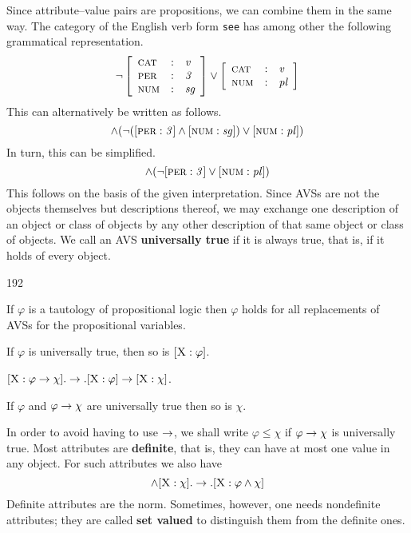 Since attribute--value pairs are propositions, we can combine
them in the same way. The category of the English verb form 
{\tt see} has among other the following grammatical representation.
\begin{equation}
\nicht \left[\begin{array}{l@{\quad : \quad}l}
\mbox{\sc cat} & \mbox{\it v} \\
\mbox{\sc per} & \mbox{\it 3} \\
\mbox{\sc num} & \mbox{\it sg}
\end{array}\right]
\oder
\left[\begin{array}{l@{\quad : \quad}l}
\mbox{\sc cat} & \mbox{\it v} \\
\mbox{\sc num} & \mbox{\it pl}
\end{array}\right]
\end{equation}
This can alternatively be written as follows.
\begin{equation}
[\mbox{\sc cat} : \mbox{\it v\/} ] \und
(\nicht ([\mbox{\sc per} : \mbox{\it 3\/}] \und
    [\mbox{\sc num} : \mbox{\it sg\/}]) \oder
[\mbox{\sc num} : \mbox{\it pl\/}])
\end{equation}
In turn, this can be simplified.
\begin{equation}
[\mbox{\sc cat} : \mbox{\it v\/} ] \und
(\nicht [\mbox{\sc per} : \mbox{\it 3\/}]
\oder [\mbox{\sc num} : \mbox{\it pl\/}])
\end{equation}
This follows on the basis of the given interpretation. Since AVSs 
are not the objects themselves but descriptions thereof, we may
exchange one description of an object or class of objects by any
other description of that same object or class of objects. We call
an AVS \textbf{universally true} if it is always true, that is, if it
holds of every object.
\begin{dingautolist}{192}
\item
If $\varphi$ is a tautology of propositional logic then
    $\varphi$ holds for all replacements of AVSs for the
    propositional variables.
\item
If $\varphi$ is universally true, then so is
$[\mbox{\sc X} : \varphi]$.
\item 
$[\mbox{\sc X} : \varphi \rightarrow \chi]. \rightarrow .
    [\mbox{\sc X} : \varphi] \rightarrow [\mbox{\sc X} : \chi]$.
\item
If $\varphi$ and $\varphi \rightarrow \chi$ are universally true then 
so is $\chi$.
\end{dingautolist}
In order to avoid having to use $\rightarrow$, we shall write 
$\varphi \leq \chi$ if $\varphi \rightarrow \chi$ is universally true.
Most attributes are \textbf{definite}, that is, they can have at most
one value in any object. For such attributes we also have
\begin{equation}
[\mbox{\sc X} : \varphi] \und
    [\mbox{\sc X} : \chi]. \pf .
    [\mbox{\sc X} : \varphi \und \chi]
\end{equation}
Definite attributes are the norm. Sometimes, however, one
needs nondefinite attributes; they are called
\textbf{set valued} to distinguish them from the definite ones.

